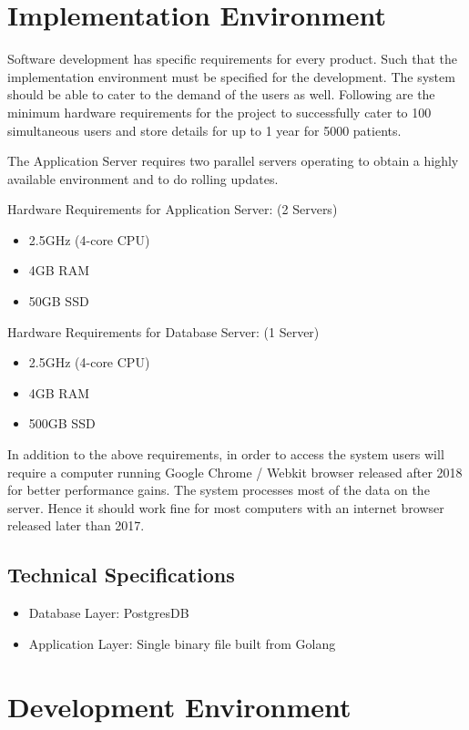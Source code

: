 \documentclass[12pt,a4paper]{report}
\begin{document}
\section{Implementation Environment}

Software development has specific requirements for every product. Such that the implementation environment must be specified for the development. The system should be able to cater to the demand of the users as well. Following are the minimum hardware requirements for the project to successfully cater to 100 simultaneous users and store details for up to 1 year for 5000 patients.

The Application Server requires two parallel servers operating to obtain a highly available environment and to do rolling updates. 

Hardware Requirements for Application Server: (2 Servers)
\begin{itemize}
	\item 2.5GHz (4-core CPU)
	\item 4GB RAM
	\item 50GB SSD
\end{itemize}

Hardware Requirements for Database Server: (1 Server)
\begin{itemize}
	\item 2.5GHz (4-core CPU)
	\item 4GB RAM
	\item 500GB SSD
\end{itemize}

In addition to the above requirements, in order to access the system users will require a computer running Google Chrome / Webkit browser released after 2018 for better performance gains. The system processes most of the data on the server. Hence it should work fine for most computers with an internet browser released later than 2017.

\subsection*{Technical Specifications}
\begin{itemize}
	\item Database Layer: PostgresDB
	\item Application Layer: Single binary file built from Golang
\end{itemize}

\section{Development Environment}
\end{document}

